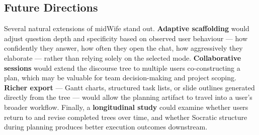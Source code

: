 \documentclass[sigconf]{acmart}
\begin{document}
\subsection{Future Directions}
Several natural extensions of midWife stand out. \textbf{Adaptive scaffolding} would
adjust question depth and specificity based on observed user behaviour --- how
confidently they answer, how often they open the chat, how aggressively they
elaborate --- rather than relying solely on the selected mode. \textbf{Collaborative
sessions} would extend the discourse tree to multiple users co-constructing a plan,
which may be valuable for team decision-making and project scoping. \textbf{Richer
export} --- Gantt charts, structured task lists, or slide outlines generated directly
from the tree --- would allow the planning artifact to travel into a user's broader
workflow. Finally, a \textbf{longitudinal study} could examine whether users return
to and revise completed trees over time, and whether Socratic structure during
planning produces better execution outcomes downstream.


\end{document}
